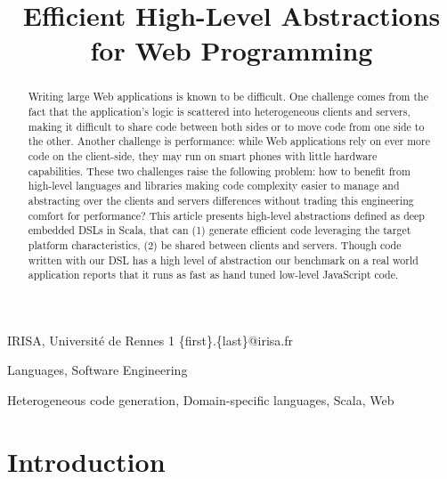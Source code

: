 \documentclass[preprint]{sigplanconf}
\begin{document}
\copyrightdata{[to be supplied]} 


\title{Efficient High-Level Abstractions for Web Programming}

           {IRISA, Université de Rennes 1}
           {\{first\}.\{last\}@irisa.fr}

\maketitle

\begin{abstract}
Writing large Web applications is known to be difficult. One challenge comes from the fact that the application's
logic is scattered into heterogeneous clients and servers, making it difficult to share code between both sides or to
move code from one side to the other. Another challenge is performance: while Web applications rely on ever more
code on the client-side, they may run on smart phones with little hardware capabilities. These two challenges raise
the following problem: how to benefit from high-level languages and libraries making code complexity easier to manage
and abstracting over the clients and servers differences without trading this engineering comfort for performance?
This article presents high-level abstractions defined as deep embedded DSLs in Scala, that can (1) generate efficient
code leveraging the target platform characteristics, (2) be shared between clients and servers. Though code written
with our DSL has a high level of abstraction our benchmark on a real world application reports that it runs as fast
as hand tuned low-level JavaScript code.
\end{abstract}


\terms Languages, Software Engineering

\keywords Heterogeneous code generation, Domain-specific languages, Scala, Web

\section{Introduction}
\end{document}
